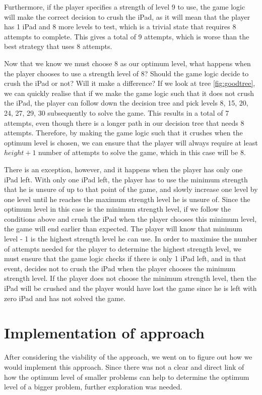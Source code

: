 \documentclass[12pt,a4paper,oneside]{report}
\begin{document}
Furthermore, if the player specifies a strength of level 9 to use, the game logic will make the correct decision to crush the iPad, as it will mean that the player has 1 iPad and 8 more levels to test, which is a trivial state that requires 8 attempts to complete. This gives a total of 9 attempts, which is worse than the best strategy that uses 8 attempts.

Now that we know we must choose 8 as our optimum level, what happens when the player chooses to use a strength level of 8? Should the game logic decide to crush the iPad or not? Will it make a difference? If we look at tree \ref{fig:goodtree}, we can quickly realise that if we make the game logic such that it does not crush the iPad, the player can follow down the decision tree and pick levels {8, 15, 20, 24, 27, 29, 30} subsequently to solve the game. This results in a total of 7 attempts, even though there is a longer path in our decision tree that needs 8 attempts. Therefore, by making the game logic such that it crushes when the optimum level is chosen, we can ensure that the player will always require at least $height + 1$ number of attempts to solve the game, which in this case will be 8.

There is an exception, however, and it happens when the player has only one iPad left. With only one iPad left, the player has to use the minimum strength that he is unsure of up to that point of the game, and slowly increase one level by one level until he reaches the maximum strength level he is unsure of. Since the optimum level in this case is the minimum strength level, if we follow the conditions above and crush the iPad when the player chooses this minimum level, the game will end earlier than expected. The player will know that minimum level - 1 is the highest strength level he can use. In order to maximise the number of attempts needed for the player to determine the highest strength level, we must ensure that the game logic checks if there is only 1 iPad left, and in that event, decides not to crush the iPad when the player chooses the minimum strength level. If the player does not choose the minimum strength level, then the iPad will be crushed and the player would have lost the game since he is left with zero iPad and has not solved the game.

\section{Implementation of approach}
After considering the viability of the approach, we went on to figure out how we would implement this approach. Since there was not a clear and direct link of how the optimum level of smaller problems can help to determine the optimum level of a bigger problem, further exploration was needed. 
\end{document}

